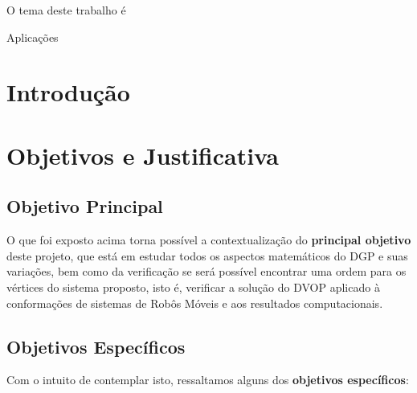 \documentclass[11pt]{article}
\begin{document}
O tema deste trabalho é 

Aplicações

\section{Introdução}


\section{Objetivos e Justificativa} \label{aims}


\subsection{Objetivo Principal}

O que foi exposto acima torna possível a contextualização do {\bf principal objetivo} deste projeto, que está em estudar todos os aspectos matemáticos do DGP e suas variações, bem como da verificação se será possível encontrar uma ordem para os vértices do sistema proposto, isto é, verificar a solução do DVOP aplicado à conformações de sistemas de Robôs Móveis e aos resultados computacionais.

\subsection{Objetivos Específicos}

Com o intuito de contemplar isto, ressaltamos alguns dos {\bf objetivos específicos}:
\end{document}
